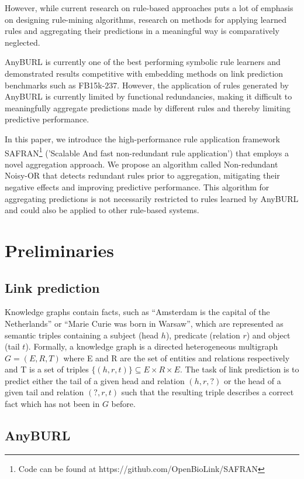 \documentclass[akbc,twoside,11pt,lettersize]{article}
\begin{document}
However, while current research on rule-based approaches puts a lot of emphasis on designing rule-mining algorithms, research on methods for applying learned rules and aggregating their predictions in a meaningful way is comparatively neglected.

AnyBURL \cite{meilicke_2019,meilicke_2020} is currently one of the best performing symbolic rule learners and demonstrated results competitive with embedding methods on link prediction benchmarks such as FB15k-237. However, the application of rules generated by AnyBURL is currently limited by functional redundancies, making it difficult to meaningfully aggregate predictions made by different rules and thereby limiting predictive performance.

In this paper, we introduce the high-performance rule application framework SAFRAN\footnote{Code can be found at https://github.com/OpenBioLink/SAFRAN} ('Scalable And fast non-redundant rule application') that employs a novel aggregation approach. We propose an algorithm called Non-redundant Noisy-OR that detects redundant rules prior to aggregation, mitigating their negative effects and improving predictive performance. This algorithm for aggregating predictions is not necessarily restricted to rules learned by AnyBURL and could also be applied to other rule-based systems.

\section{Preliminaries}

\subsection{Link prediction}

Knowledge graphs contain facts, such as “Amsterdam is the capital of the Netherlands” or “Marie Curie was born in Warsaw”, which are represented as semantic triples containing a subject (head $h$), predicate (relation $r$) and object (tail $t$). Formally, a knowledge graph is a directed heterogeneous multigraph $G = (E,R,T)$ where E and R are the set of entities and relations respectively and T is a set of triples $\{(h, r, t)\} \subseteq E \times R \times E$. The task of link prediction is to predict either the tail of a given head and relation $(h, r, ?)$ or the head of a given tail and relation $(?, r, t)$ such that the resulting triple describes a correct fact which has not been in $G$ before.

\subsection{AnyBURL}
\end{document}
